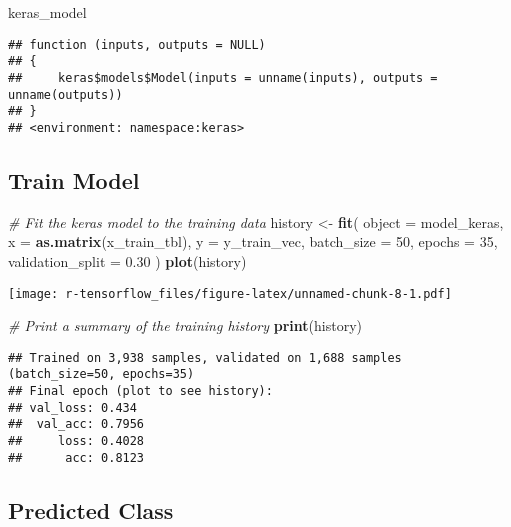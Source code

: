 \documentclass[]{article}
\newenvironment{Shaded}{\begin{snugshade}}{\end{snugshade}}
\newcommand{\KeywordTok}[1]{\textcolor[rgb]{0.13,0.29,0.53}{\textbf{#1}}}
\newcommand{\DataTypeTok}[1]{\textcolor[rgb]{0.13,0.29,0.53}{#1}}
\newcommand{\DecValTok}[1]{\textcolor[rgb]{0.00,0.00,0.81}{#1}}
\newcommand{\FloatTok}[1]{\textcolor[rgb]{0.00,0.00,0.81}{#1}}
\newcommand{\StringTok}[1]{\textcolor[rgb]{0.31,0.60,0.02}{#1}}
\newcommand{\CommentTok}[1]{\textcolor[rgb]{0.56,0.35,0.01}{\textit{#1}}}
\newcommand{\NormalTok}[1]{#1}
\begin{document}
\begin{Shaded}
\begin{Highlighting}[]
\NormalTok{keras_model}
\end{Highlighting}
\end{Shaded}

\begin{verbatim}
## function (inputs, outputs = NULL) 
## {
##     keras$models$Model(inputs = unname(inputs), outputs = unname(outputs))
## }
## <environment: namespace:keras>
\end{verbatim}

\subsection{Train Model}\label{train-model}

\begin{Shaded}
\begin{Highlighting}[]
\CommentTok{# Fit the keras model to the training data}
\NormalTok{history <-}\StringTok{ }\KeywordTok{fit}\NormalTok{(}
  \DataTypeTok{object           =}\NormalTok{ model_keras, }
  \DataTypeTok{x                =} \KeywordTok{as.matrix}\NormalTok{(x_train_tbl), }
  \DataTypeTok{y                =}\NormalTok{ y_train_vec,}
  \DataTypeTok{batch_size       =} \DecValTok{50}\NormalTok{, }
  \DataTypeTok{epochs           =} \DecValTok{35}\NormalTok{,}
  \DataTypeTok{validation_split =} \FloatTok{0.30}
\NormalTok{)}
\KeywordTok{plot}\NormalTok{(history)}
\end{Highlighting}
\end{Shaded}

\texttt{[image: r-tensorflow\_files/figure-latex/unnamed-chunk-8-1.pdf]}

\begin{Shaded}
\begin{Highlighting}[]
\CommentTok{# Print a summary of the training history}
\KeywordTok{print}\NormalTok{(history)}
\end{Highlighting}
\end{Shaded}

\begin{verbatim}
## Trained on 3,938 samples, validated on 1,688 samples (batch_size=50, epochs=35)
## Final epoch (plot to see history):
## val_loss: 0.434
##  val_acc: 0.7956
##     loss: 0.4028
##      acc: 0.8123
\end{verbatim}

\subsection{Predicted Class}\label{predicted-class}
\end{document}
